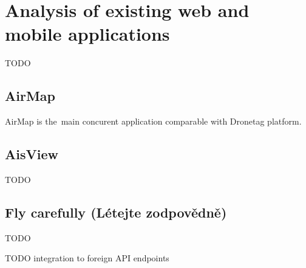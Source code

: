 \chapter{Analysis of existing web and mobile applications}

TODO

\section{AirMap}
AirMap is the~main concurent application comparable with Dronetag platform.%

\section{AisView}
TODO

\section{Fly carefully (Létejte zodpovědně)}
TODO


TODO integration to foreign API endpoints


